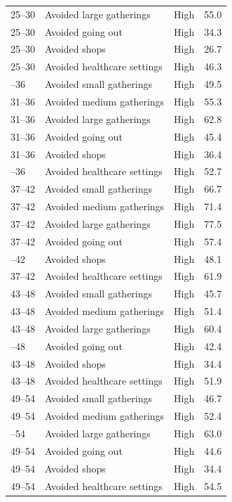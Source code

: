 \documentclass[
  12pt,
  a4paper,
]{article}
\begin{document}
\begin{longtable}[t]{lllr}
25--30 & Avoided large gatherings & High & 55.0\\
25--30 & Avoided going out & High & 34.3\\
25--30 & Avoided shops & High & 26.7\\
25--30 & Avoided healthcare settings & High & 46.3\\
\addlinespace
31--36 & Avoided small gatherings & High & 49.5\\
31--36 & Avoided medium gatherings & High & 55.3\\
31--36 & Avoided large gatherings & High & 62.8\\
31--36 & Avoided going out & High & 45.4\\
31--36 & Avoided shops & High & 36.4\\
\addlinespace
31--36 & Avoided healthcare settings & High & 52.7\\
37--42 & Avoided small gatherings & High & 66.7\\
37--42 & Avoided medium gatherings & High & 71.4\\
37--42 & Avoided large gatherings & High & 77.5\\
37--42 & Avoided going out & High & 57.4\\
\addlinespace
37--42 & Avoided shops & High & 48.1\\
37--42 & Avoided healthcare settings & High & 61.9\\
43--48 & Avoided small gatherings & High & 45.7\\
43--48 & Avoided medium gatherings & High & 51.4\\
43--48 & Avoided large gatherings & High & 60.4\\
\addlinespace
43--48 & Avoided going out & High & 42.4\\
43--48 & Avoided shops & High & 34.4\\
43--48 & Avoided healthcare settings & High & 51.9\\
49--54 & Avoided small gatherings & High & 46.7\\
49--54 & Avoided medium gatherings & High & 52.4\\
\addlinespace
49--54 & Avoided large gatherings & High & 63.0\\
49--54 & Avoided going out & High & 44.6\\
49--54 & Avoided shops & High & 34.4\\
49--54 & Avoided healthcare settings & High & 54.5\\
\bottomrule
\end{longtable}
\end{document}
